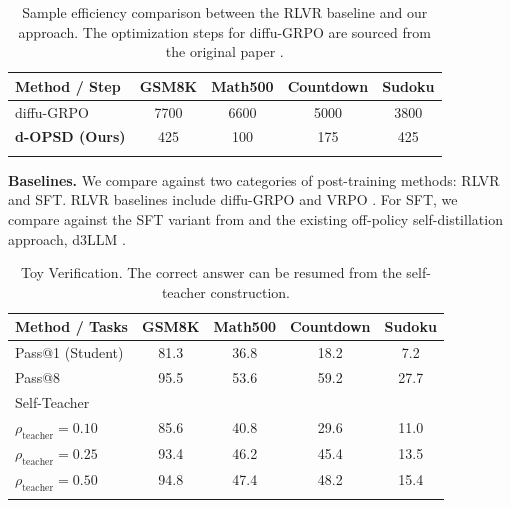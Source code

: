 \documentclass{llmxive}
\begin{document}
\begin{table}[t]
\vspace{-18pt}
\setlength{\tabcolsep}{4pt}
\centering
\begin{tabular}{lcccc}
\toprule
\textbf{Method / Step} & \textbf{GSM8K} & \textbf{Math500} & \textbf{Countdown} & \textbf{Sudoku} \\
\midrule
diffu-GRPO & 7700 & 6600 & 5000 & 3800 \\
\textbf{d-OPSD (Ours)} & \cellcolor{lightblue} 425 & \cellcolor{lightblue}  100 & \cellcolor{lightblue}  175 & \cellcolor{lightblue}  425\\
\bottomrule
\label{tab3}
\end{tabular}
\vspace{-15pt}

\caption{Sample efficiency comparison between the RLVR baseline and our approach. The optimization steps for diffu-GRPO are sourced from the original paper \citep{zhao2025d1}.}
\end{table}

\textbf{Baselines. } We compare against two categories of post-training methods: RLVR and SFT. RLVR baselines include diffu-GRPO \citep{zhao2025d1} and VRPO \citep{zhu2025llada}. For SFT, we compare against the SFT variant from \citep{zhao2025d1} and the existing off-policy self-distillation approach, d3LLM \citep{qian2026d3llm}.

\begin{table}[t]
\vspace{-15pt}
\setlength{\tabcolsep}{4pt}
\centering
\small
\begin{tabular}{lcccc}
\toprule
\textbf{Method / Tasks} & \textbf{GSM8K} & \textbf{Math500} & \textbf{Countdown} & \textbf{Sudoku} \\
\midrule
Pass@1 (Student) & 81.3 & 36.8 & 18.2 & 7.2 \\
Pass@8 & 95.5 & 53.6 & 59.2 & 27.7\\
Self-Teacher \\
\quad $\rho_\text{teacher} = 0.10 $ & 85.6 & 40.8 & 29.6 & 11.0 \\
\quad $\rho_\text{teacher} = 0.25 $ & 93.4 & 46.2 & 45.4 & 13.5 \\
\quad $\rho_\text{teacher} = 0.50 $ & 94.8 & 47.4 & 48.2 & 15.4 \\
\bottomrule
\label{tab1}
\end{tabular}
\vspace{-15pt}

\caption{Toy Verification. The correct answer can be resumed from the self-teacher construction.}
\end{table}
\end{document}
